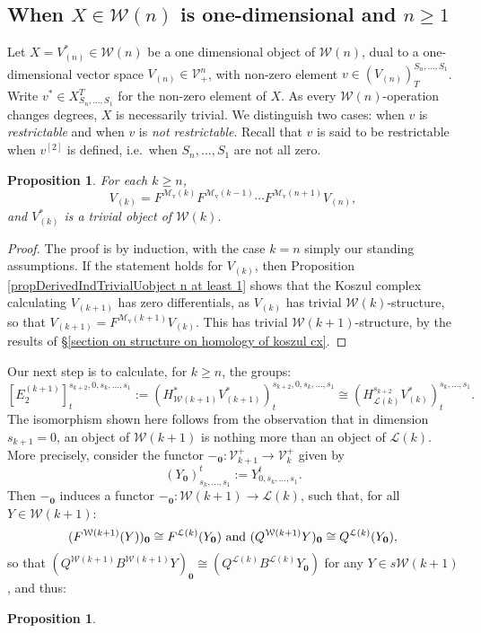 \documentclass[11pt]{amsart} \renewcommand{\baselinestretch}{1.2}
\theoremstyle{plain}
\newtheorem{prop}[thm]{Proposition}
\numberwithin{equation}{section} %
\theoremstyle{plain}
\newtheorem{prop}[thm]{Proposition}
\numberwithin{equation}{chapter} %
\newcommand{\DASH}{\mathrm{-}}
\renewcommand{\to}{\longrightarrow}
\newcommand{\calL}{\mathcal{L}}
\newcommand{\calV}{\mathcal{V}}
\newcommand{\calw}{\mathcal{W}}
\newcommand{\calMv}{\mathcal{M}\dver}
\newcommand{\restn}[1]{#1^{[2]}}
\newcommand{\vect}[2]{\calV^{#1}_{#2}}
\newcommand{\E}[5]{[E^{#1}_{#2}#3]^{#4}_{#5}}
\newcommand{\dver}{_\mathrm{v}}
\newcommand{\SubsectionOrSection}[1]{\subsection{#1}}
\begin{document}
\begin{Calculations of HWn}
\SubsectionOrSection{When $X\in\calw(n)$ is one-dimensional and $n\geq1$}
\label{one-dimensional, n geq1}
Let $X=V^*_{(n)}\in\calw(n)$ be a one dimensional object of $\calw(n)$, %
dual to a one-dimensional vector space $V_{(n)}\in\vect{n}{+}$, with non-zero element $v\in(V_{(n)})^{S_n,\ldots,S_1}_T$. Write $v^*\in X^T_{S_n,\ldots,S_1}$ for the non-zero element of $X$. As every $\calw(n)$-operation changes degrees, $X$ is necessarily trivial. We distinguish two cases: when $v$ is \emph{restrictable} and when $v$ is \emph{not restrictable}. Recall that $v$ is said to be restrictable when $\restn{v}$ is defined, i.e.\ when $S_n,\ldots,S_1$ are not all zero.
\begin{prop}
\label{iterative calc of the Vk all trivial}
For each $k\geq n$,
\[V_{(k)}=F^{\calMv(k)}F^{\calMv(k-1)}\cdots F^{\calMv(n+1)}V_{(n)},\]
and $V^*_{(k)}$ is a trivial object of $\calw(k)$.
\end{prop}
\begin{proof}
The proof is by induction, with the case $k=n$ simply our standing assumptions. If the statement holds for $V_{(k)}$, then Proposition \ref{propDerivedIndTrivialUobject n at least 1} shows that the Koszul complex calculating $V_{(k+1)}$ has zero differentials, as $V_{(k)}$ has trivial $\calw(k)$-structure, so that $V_{(k+1)}=F^{\calMv(k+1)}V_{(k)}$. This has trivial $\calw(k+1)$-structure, by the results of \S\ref{section on structure on homology of koszul cx}.
\end{proof}
Our next step is to calculate, for $k\geq n$, the groups:
\[\E{(k+1)}{2}{}{s_{k+2},0,s_k,\ldots,s_1}{t}:=(H^*_{\calw(k+1)}V^*_{(k+1)})^{s_{k+2},0,s_k,\ldots,s_1}_{t}\cong (H^{s_{k+2}}_{\calL(k)}V^*_{(k)})^{s_k,\ldots,s_1}_{t}.\]
The isomorphism shown here follows from the observation that in dimension $s_{k+1}=0$, an object of $\calw(k+1)$ is nothing more than an object of $\calL(k)$. More precisely, consider the functor $\DASH_\textbf{0}:\vect{+}{k+1}\to \vect{+}{k}$ given by
\[(Y_\textbf{0})^t_{s_k,\ldots,s_1}:=Y^t_{0,s_k,\ldots,s_1}.\]
Then $\DASH_\textbf{0}$ induces a functor $\DASH_\textbf{0}:\calw(k+1)\to \calL(k)$, such that, for all $Y\in\calw(k+1)$:
\[(F^{\calw(k+1)}(Y))_\textbf{0}\cong F^{\calL(k)}(Y_\textbf{0})\textup{ and }(Q^{\calw(k+1)}Y)_\textbf{0}\cong Q^{\calL(k)}(Y_\textbf{0}),\]
so that $(Q^{\calw(k+1)}B^{\calw(k+1)}Y)_{\textbf{0}} \cong(Q^{\calL(k)}B^{\calL(k)}Y_{\textbf{0}})$ for any $Y\in s\calw(k+1)$, and thus:
\begin{prop}

\end{prop}
\end{Calculations of HWn}
\end{document}
